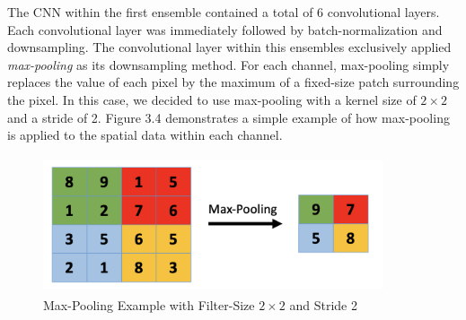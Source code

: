\documentclass [MAS] {uclathes}
\begin{document}
The CNN within the first ensemble contained a total of 6 convolutional layers. Each convolutional layer was immediately followed by batch-normalization and downsampling. The convolutional layer within this ensembles exclusively applied \textit{max-pooling} as its downsampling method. For each channel, max-pooling simply replaces the value of each pixel by the maximum of a fixed-size patch surrounding the pixel. In this case, we decided to use max-pooling with a kernel size of $2 \times 2$ and a stride of 2. Figure 3.4 demonstrates a simple example of how max-pooling is applied to the spatial data within each channel. 

\begin{figure}[h]
\centering
\includegraphics[height = 40mm, width= 100mm]{imgs/maxpool.png}
\caption{Max-Pooling Example with Filter-Size $2 \times 2$ and Stride 2}
\label{fig:maxpool}
\end{figure}
\end{document}
